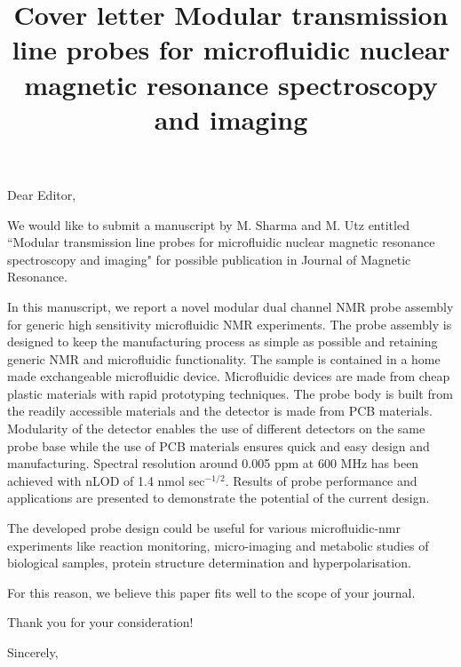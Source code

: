 \documentclass[12pt, letterpaper, twoside]{article}
\title{Cover letter Modular transmission line probes for microfluidic nuclear magnetic resonance spectroscopy and imaging}
\begin{document}
Dear Editor,

We would like to submit a manuscript by M. Sharma and M. Utz entitled ``Modular transmission line probes for microfluidic nuclear magnetic resonance spectroscopy and imaging" for possible publication in Journal of Magnetic Resonance.

In this manuscript, we report a novel modular dual channel NMR probe assembly for generic high sensitivity microfluidic NMR experiments. The probe assembly is designed to keep the manufacturing process as simple as possible and retaining generic NMR and microfluidic functionality. The sample is contained in a home made exchangeable microfluidic device. Microfluidic devices are made from cheap plastic materials with rapid prototyping techniques. The probe body is built from the readily accessible materials and the detector is made from PCB materials. Modularity of the detector enables the use of different detectors on the same probe base while the use of PCB materials ensures quick and easy design and manufacturing. Spectral resolution around 0.005 ppm at 600 MHz has been achieved with nLOD of 1.4 nmol sec$^{-1/2}$. Results of probe performance and applications are presented to demonstrate the potential of the current design.

The developed probe design could be useful for various microfluidic-nmr experiments like reaction monitoring, micro-imaging and metabolic studies of biological samples, protein structure determination and hyperpolarisation.

For this reason, we believe this paper fits well to the scope of your journal.

Thank you for your consideration!

Sincerely,
\end{document}
